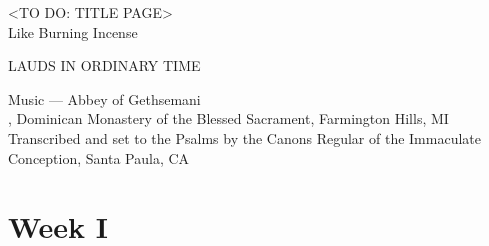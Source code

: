 \documentclass[12pt,twocolumn]{book}
\begin{document}
\pagestyle{empty}
\onecolumn

\null\vfill
\begin{center}
  \huge
  <TO DO: TITLE PAGE>\\
  Like Burning Incense
  
  \large\medskip LAUDS IN ORDINARY TIME
\end{center}
\vfill\vfill

\newpage

\null\vfill
\begin{center}
  \vfill\small
  Music --- Abbey of Gethsemani\\
  , Dominican Monastery of the Blessed Sacrament, Farmington Hills, MI\\
  Transcribed and set to the Psalms by the Canons Regular of the Immaculate Conception, Santa Paula, CA
\end{center}


\newpage



\tableofcontents
\setlength{\columnseprule}{0pt}
\null
\twocolumn
\chapter{Week I}
\setlength{\columnseprule}{0.4pt}
\pagestyle{fancy}




\end{document}
